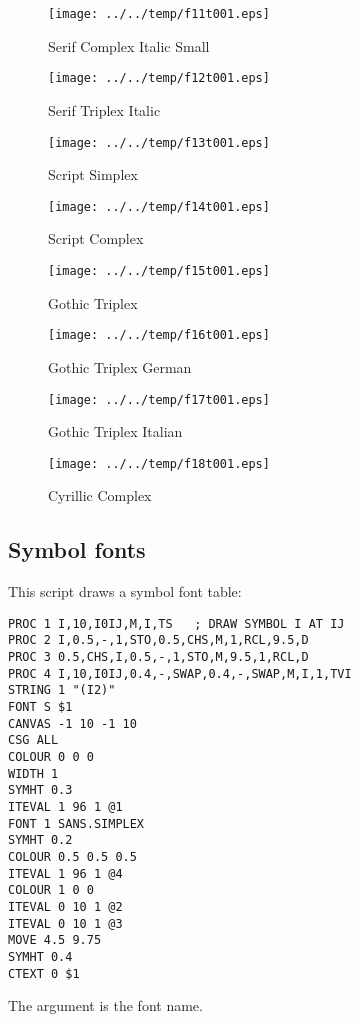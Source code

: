 \documentclass[a4paper,twoside,11pt]{article}
\makeatletter
\def\maxwidth{%
  \ifdim\Gin@nat@width>\linewidth
    \linewidth
  \else
    \Gin@nat@width
  \fi
}
\newcommand{\newpara}{\par\vspace{4mm}\noindent}
\makeatother
\begin{document}
\clearpage
\begin{figure}
  \centering
  \texttt{[image: ../../temp/f11t001.eps]}
  \caption{Serif Complex Italic Small}
  \label{fig:f11t001}
\end{figure}

\begin{figure}
  \centering
  \texttt{[image: ../../temp/f12t001.eps]}
  \caption{Serif Triplex Italic}
  \label{fig:f12t001}
\end{figure}

\clearpage
\begin{figure}
  \centering
  \texttt{[image: ../../temp/f13t001.eps]}
  \caption{Script Simplex}
  \label{fig:f13t001}
\end{figure}

\begin{figure}
  \centering
  \texttt{[image: ../../temp/f14t001.eps]}
  \caption{Script Complex}
  \label{fig:f14t001}
\end{figure}

\clearpage
\begin{figure}
  \centering
  \texttt{[image: ../../temp/f15t001.eps]}
  \caption{Gothic Triplex}
  \label{fig:f15t001}
\end{figure}

\begin{figure}
  \centering
  \texttt{[image: ../../temp/f16t001.eps]}
  \caption{Gothic Triplex German}
  \label{fig:f16t001}
\end{figure}

\clearpage
\begin{figure}
  \centering
  \texttt{[image: ../../temp/f17t001.eps]}
  \caption{Gothic Triplex Italian}
  \label{fig:f17t001}
\end{figure}

\begin{figure}
  \centering
  \texttt{[image: ../../temp/f18t001.eps]}
  \caption{Cyrillic Complex}
  \label{fig:f18t001}
\end{figure}


\clearpage
\subsection{Symbol fonts}

\newpara
This script draws a symbol font table:
\begin{lstlisting}
PROC 1 I,10,I0IJ,M,I,TS   ; DRAW SYMBOL I AT IJ
PROC 2 I,0.5,-,1,STO,0.5,CHS,M,1,RCL,9.5,D
PROC 3 0.5,CHS,I,0.5,-,1,STO,M,9.5,1,RCL,D
PROC 4 I,10,I0IJ,0.4,-,SWAP,0.4,-,SWAP,M,I,1,TVI
STRING 1 "(I2)"
FONT S $1 
CANVAS -1 10 -1 10
CSG ALL
COLOUR 0 0 0
WIDTH 1
SYMHT 0.3 
ITEVAL 1 96 1 @1
FONT 1 SANS.SIMPLEX 
SYMHT 0.2 
COLOUR 0.5 0.5 0.5
ITEVAL 1 96 1 @4
COLOUR 1 0 0
ITEVAL 0 10 1 @2
ITEVAL 0 10 1 @3
MOVE 4.5 9.75
SYMHT 0.4
CTEXT 0 $1
\end{lstlisting}
The argument is the font name.
\end{document}
